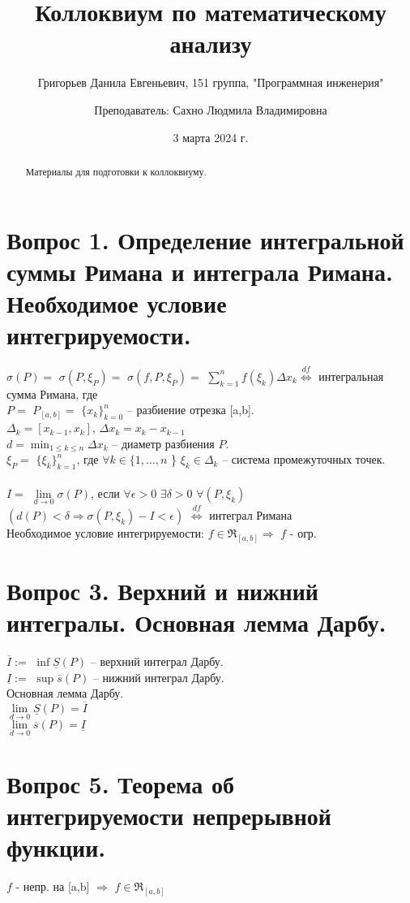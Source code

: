 \documentclass{article}
\title{\bf{Коллоквиум по математическому анализу}}
\author{Григорьев Данила Евгеньевич, 151 группа, "Программная инженерия" \and Преподаватель: Сахно Людмила Владимировна}
\date{3 марта 2024 г.}
\begin{document}
\pagestyle{fancy}
\maketitle

\begin{abstract}
    Материалы для подготовки к коллоквиуму.
\end{abstract}

\tableofcontents
\newpage
\section{Вопрос 1. Определение интегральной суммы Римана и интеграла Римана. Необходимое условие интегрируемости.}
$\sigma(P) =$ $\sigma(P, \xi_P) =$ $\sigma(f, P, \xi_P) =$ $\displaystyle\sum_{k=1}^{n}f(\xi_k)\Delta x_k \overset {df} \Leftrightarrow$ интегральная сумма Римана, где \\
$P =$ $P_{[a,b]} =$ $\{x_k\}_{k=0}^n$ -- разбиение отрезка [a,b]. \\
$\Delta_k = [x_{k-1}, x_k]$, $\Delta x_k = x_k - x_{k-1}$ \\
$d = \displaystyle\min_{1 \leq k \leq n}{\Delta x_k}$ -- диаметр разбиения $P$. \\
$\xi_P =$ $\{\xi_k\}_{k=1}^{n}$, где $\forall k \in \{ 1,\dots,n$ \} $\xi_k \in \Delta_k$ -- система промежуточных точек. \\
\\
$I =$ $\lim\limits_{d \to 0}{\sigma(P)}$, если $\forall \epsilon > 0$ $\exists \delta > 0$ $\forall(P, \xi_k)$ $(d(P) < \delta \Rightarrow \sigma(P, \xi_k) - I < \epsilon) $ $\overset{df}{\Leftrightarrow}$ интеграл Римана \\
Необходимое условие интегрируемости:
$f \in \Re_{[a,b]} \Rightarrow$ $f$ - огр.
\section{Вопрос 3. Верхний и нижний интегралы. Основная лемма Дарбу.}
$\overline I :=$ $\inf{\underline S(P)}$ -- верхний интеграл Дарбу. \\
$\underline I :=$ $\sup{\overline s(P)}$ -- нижний интеграл Дарбу. \\
Основная лемма Дарбу. \\
$\lim\limits_{d \to 0}{\underline S(P)} = \overline I$ \\
$\lim\limits_{d \to 0}{\overline s(P)} = \underline I$

\section{Вопрос 5. Теорема об интегрируемости непрерывной функции.}
$f$ - непр. на [a,b] $\Rightarrow$ $f \in \Re_{[a,b]}$
\end{document}
